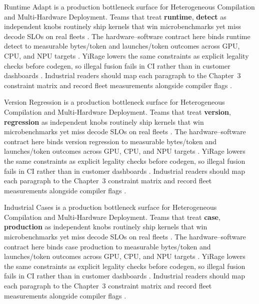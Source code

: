 Runtime Adapt is a production bottleneck surface for Heterogeneous Compilation and Multi-Hardware Deployment. Teams that treat \textbf{runtime}, \textbf{detect} as independent knobs routinely ship kernels that win microbenchmarks yet miss decode SLOs on real fleets \citep{patel2025llminference,nvidia2022hopper}. The hardware--software contract here binds runtime detect to measurable bytes/token and launches/token outcomes across GPU, CPU, and NPU targets \citep{taxbreak2026,semianalysis2024tma}. YiRage lowers the same constraints as explicit legality checks before codegen, so illegal fusion fails in CI rather than in customer dashboards \citep{memoryfloor2026,amd2024xdna}. Industrial readers should map each paragraph to the Chapter~3 constraint matrix and record fleet measurements alongside compiler flags \citep{nvidia2022hopper,amd2024aie}.

Version Regression is a production bottleneck surface for Heterogeneous Compilation and Multi-Hardware Deployment. Teams that treat \textbf{version}, \textbf{regression} as independent knobs routinely ship kernels that win microbenchmarks yet miss decode SLOs on real fleets \citep{taxbreak2026,semianalysis2024tma}. The hardware--software contract here binds version regression to measurable bytes/token and launches/token outcomes across GPU, CPU, and NPU targets \citep{memoryfloor2026,amd2024xdna}. YiRage lowers the same constraints as explicit legality checks before codegen, so illegal fusion fails in CI rather than in customer dashboards \citep{nvidia2022hopper,amd2024aie}. Industrial readers should map each paragraph to the Chapter~3 constraint matrix and record fleet measurements alongside compiler flags \citep{semianalysis2024tma,dlbook}.

Industrial Cases is a production bottleneck surface for Heterogeneous Compilation and Multi-Hardware Deployment. Teams that treat \textbf{case}, \textbf{production} as independent knobs routinely ship kernels that win microbenchmarks yet miss decode SLOs on real fleets \citep{memoryfloor2026,amd2024xdna}. The hardware--software contract here binds case production to measurable bytes/token and launches/token outcomes across GPU, CPU, and NPU targets \citep{nvidia2022hopper,amd2024aie}. YiRage lowers the same constraints as explicit legality checks before codegen, so illegal fusion fails in CI rather than in customer dashboards \citep{semianalysis2024tma,dlbook}. Industrial readers should map each paragraph to the Chapter~3 constraint matrix and record fleet measurements alongside compiler flags \citep{amd2024xdna,dao2022flashattention}.

